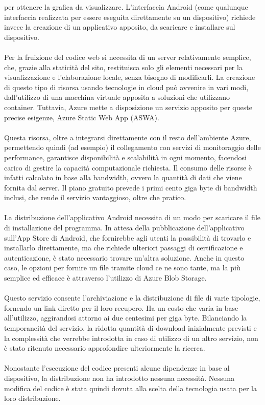 per ottenere la grafica da visualizzare.
L'interfaccia Android (come qualunque interfaccia realizzata per essere eseguita direttamente su un dispositivo)
richiede invece la creazione di un applicativo apposito, 
da scaricare e installare sul dispositivo.\\
\\
Per la fruizione del codice web si necessita di un server relativamente semplice,
che, grazie alla staticità del sito, 
restituisca solo gli elementi necessari per la visualizzazione e l'elaborazione locale,
senza bisogno di modificarli.
La creazione di questo tipo di risorsa usando tecnologie in cloud può avvenire in vari modi,
dall'utilizzo di una macchina virtuale apposita a soluzioni che utilizzano container.
Tuttavia, Azure mette a disposizione un servizio apposito per queste precise esigenze,
Azure Static Web App (ASWA).\\
\\
Questa risorsa, oltre a integrarsi direttamente con il resto dell'ambiente Azure,
permettendo quindi (ad esempio) il collegamento con servizi di monitoraggio delle performance,
garantisce disponibilità e scalabilità in ogni momento,
facendosi carico di gestire la capacità computazionale richiesta.
Il consumo delle risorse è infatti calcolato in base alla bandwidth, 
ovvero la quantità di dati che viene fornita dal server.
Il piano gratuito prevede i primi cento giga byte di bandwidth inclusi,
che rende il servizio vantaggioso, oltre che pratico.\\
\\
La distribuzione dell'applicativo Android 
necessita di un modo per scaricare il file di installazione del programma.
In attesa della pubblicazione dell'applicativo sull'App Store di Android, 
che fornirebbe agli utenti la possibilità di trovarlo e installarlo direttamente,
ma che richiede ulteriori passaggi di certificazione e autenticazione,
è stato necessario trovare un'altra soluzione.
Anche in questo caso, 
le opzioni per fornire un file tramite cloud ce ne sono tante,
ma la più semplice ed efficace è attraverso l'utilizzo di Azure Blob Storage.\\
\\
Questo servizio consente l'archiviazione e la distribuzione di file di varie tipologie,
fornendo un link diretto per il loro recupero.
Ha un costo che varia in base all'utilizzo, 
aggirandosi attorno ai due centesimi per giga byte.
Bilanciando la temporaneità del servizio,
la ridotta quantità di download inizialmente previsti e
la complessità che verrebbe introdotta in caso di utilizzo di un altro servizio,
non è stato ritenuto necessario approfondire ulteriormente la ricerca.\\
\\
Nonostante l'esecuzione del codice presenti alcune dipendenze in base al dispositivo,
la distribuzione non ha introdotto nessuna necessità.
Nessuna modifica del codice è stata quindi dovuta alla scelta della tecnologia usata per 
la loro distribuzione.\\
\\

